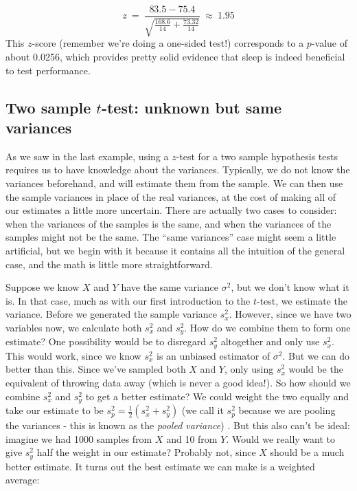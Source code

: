 \begin{equation*}
z\ = \ \frac{83.5-75.4}{\sqrt{\frac{168.6}{14}+\frac{73.32}{14}}}\ \approx \ 1.95
\end{equation*}
This $z$-score (remember we're doing a one-sided test!) corresponds to a $p$-value of about 0.0256, which provides pretty solid evidence that sleep is indeed beneficial to test performance.


\subsection{Two sample $t$-test: unknown but same variances}

As we saw in the last example, using a $z$-test for a two sample hypothesis tests requires us to have knowledge about the variances.  Typically, we do not know the variances beforehand, and will estimate them from the sample.  We can then use the sample variances in place of the real variances, at the cost of making all of our estimates a little more uncertain.  There are actually two cases to consider: when the variances of the samples is the same, and when the variances of the samples might not be the same.  The ``same variances'' case might seem a little artificial, but we begin with it because it contains all the intuition of the general case, and the math is little more straightforward.

Suppose we know $X$ and $Y$ have the same variance $\sigma^2$, but we don't know what it is.  In that case,  much as with our first introduction to the $t$-test, we estimate the variance.  Before we generated the sample variance $s^2_x$.  However, since we have two variables now, we calculate both $s^2_x$ and $s^2_y$.  How do we combine them to form one estimate?  One possibility would be to disregard $s^2_y$ altogether and only use $s^2_x$.  This would work, since we know $s^2_x$ is an unbiased estimator of $\sigma^2$.  But we can do better than this.  Since we've sampled both $X$ and $Y$, only using $s^2_x$ would be the equivalent of throwing data away (which is never a good idea!).  So how should we combine $s^2_x$ and $s^2_y$ to get a better estimate?  We could weight the two equally and take our estimate to be $s^2_p = \frac{1}{2}\left(s^2_x + s^2_y\right)$ (we call it $s^2_p$ because we are pooling the variances - this is known as the \emph{pooled variance}) .  But this also can't be ideal: imagine we had 1000 samples from $X$ and 10 from $Y$.  Would we really want to give $s^2_y$ half the weight in our estimate? Probably not, since $X$ should be a much better estimate.  It turns out the best estimate we can make is a weighted average:


